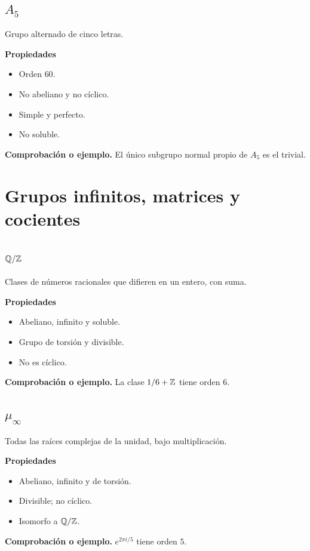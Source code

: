 \documentclass[11pt,a4paper]{article}
\begin{document}
\subsection{$A_5$}
\begin{ejemplo}
Grupo alternado de cinco letras.
\end{ejemplo}
\textbf{Propiedades}
\begin{itemize}
\item Orden $60$.
\item No abeliano y no cíclico.
\item Simple y perfecto.
\item No soluble.
\end{itemize}
\textbf{Comprobación o ejemplo.} El único subgrupo normal propio de $A_5$ es el trivial.

\section{Grupos infinitos, matrices y cocientes}

\subsection{$\mathbb{Q}/\mathbb{Z}$}
\begin{ejemplo}
Clases de números racionales que difieren en un entero, con suma.
\end{ejemplo}
\textbf{Propiedades}
\begin{itemize}
\item Abeliano, infinito y soluble.
\item Grupo de torsión y divisible.
\item No es cíclico.
\end{itemize}
\textbf{Comprobación o ejemplo.} La clase $1/6+\mathbb{Z}$ tiene orden $6$.

\subsection{$\mu_\infty$}
\begin{ejemplo}
Todas las raíces complejas de la unidad, bajo multiplicación.
\end{ejemplo}
\textbf{Propiedades}
\begin{itemize}
\item Abeliano, infinito y de torsión.
\item Divisible; no cíclico.
\item Isomorfo a $\mathbb{Q}/\mathbb{Z}$.
\end{itemize}
\textbf{Comprobación o ejemplo.} $e^{2\pi i/5}$ tiene orden $5$.
\end{document}
